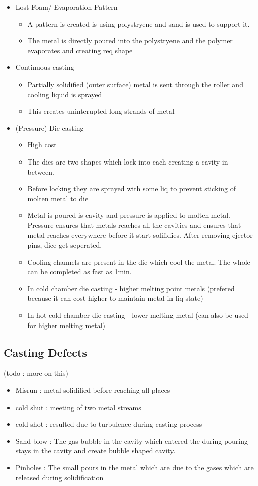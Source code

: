 \documentclass{article}
\begin{document}
\begin{itemize}
\item Lost Foam/ Evaporation Pattern
	\begin{itemize}
	\item A pattern is created is using polystryene and sand is used to support it.
	\item The metal is directly poured into the polystryene and the polymer evaporates and creating req shape
	\end{itemize}


\item Continuous casting
	\begin{itemize}
	\item Partially solidified (outer surface) metal is sent through the roller and cooling liquid is sprayed
	\item This creates uninterupted long strands of metal
	\end{itemize}


 \item (Pressure) Die casting
 	\begin{itemize}
 	\item High cost
 	\item The dies are two shapes which lock into each creating a cavity in between. 
 	\item Before locking they are sprayed with some liq to prevent sticking of molten metal to die
 	\item Metal is poured is cavity and pressure is applied to molten metal. Pressure ensures that metals reaches all the cavities and ensures that metal reaches everywhere before it start solifidies. After removing ejector pins, dice get seperated.
 	\item Cooling channels are present in the die which cool the metal. The whole can be completed as fast as 1min.
 	\item In cold chamber die casting - higher melting point metals (prefered because it can cost higher to maintain metal in liq state) 
 	\item In hot cold chamber die casting - lower melting metal (can also be used for higher melting metal)
	\end{itemize}


\end{itemize}


\subsection{Casting Defects}
(todo : more on this)
\begin{itemize}
 	\item Misrun : metal solidified before reaching all places
 	\item cold shut : meeting of two metal streams
 	\item cold shot : resulted due to turbulence during casting process
	\item Sand blow : The gas bubble in the cavity which entered the during pouring stays in the cavity and create bubble shaped cavity.
	\item Pinholes : The small pours in the metal which are due to the gases which are released during solidification
\end{itemize}
\end{document}
